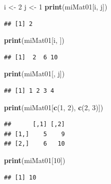 \documentclass[]{book}
\newenvironment{Shaded}{\begin{snugshade}}{\end{snugshade}}
\newcommand{\KeywordTok}[1]{\textcolor[rgb]{0.13,0.29,0.53}{\textbf{#1}}}
\newcommand{\DecValTok}[1]{\textcolor[rgb]{0.00,0.00,0.81}{#1}}
\newcommand{\StringTok}[1]{\textcolor[rgb]{0.31,0.60,0.02}{#1}}
\newcommand{\NormalTok}[1]{#1}
\begin{document}
\begin{Shaded}
\begin{Highlighting}[]
\NormalTok{i <-}\StringTok{ }\DecValTok{2}
\NormalTok{j <-}\StringTok{ }\DecValTok{1}
\KeywordTok{print}\NormalTok{(miMat01[i, j])}
\end{Highlighting}
\end{Shaded}

\begin{verbatim}
## [1] 2
\end{verbatim}

\begin{Shaded}
\begin{Highlighting}[]
\KeywordTok{print}\NormalTok{(miMat01[i, ])}
\end{Highlighting}
\end{Shaded}

\begin{verbatim}
## [1]  2  6 10
\end{verbatim}

\begin{Shaded}
\begin{Highlighting}[]
\KeywordTok{print}\NormalTok{(miMat01[, j])}
\end{Highlighting}
\end{Shaded}

\begin{verbatim}
## [1] 1 2 3 4
\end{verbatim}

\begin{Shaded}
\begin{Highlighting}[]
\KeywordTok{print}\NormalTok{(miMat01[}\KeywordTok{c}\NormalTok{(}\DecValTok{1}\NormalTok{, }\DecValTok{2}\NormalTok{), }\KeywordTok{c}\NormalTok{(}\DecValTok{2}\NormalTok{, }\DecValTok{3}\NormalTok{)])}
\end{Highlighting}
\end{Shaded}

\begin{verbatim}
##      [,1] [,2]
## [1,]    5    9
## [2,]    6   10
\end{verbatim}

\begin{Shaded}
\begin{Highlighting}[]
\KeywordTok{print}\NormalTok{(miMat01[}\DecValTok{10}\NormalTok{])}
\end{Highlighting}
\end{Shaded}

\begin{verbatim}
## [1] 10
\end{verbatim}
\end{document}
